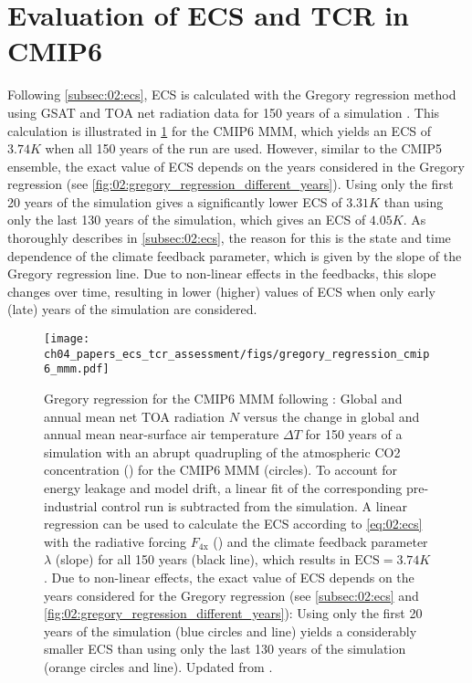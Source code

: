 \section{Evaluation of \acs{ECS} and \acs{TCR} in \acs{CMIP}6}
\label{sec:04:evaluation_ecs_and_tcr}

Following \cref{subsec:02:ecs}, \ac{ECS} is calculated with the Gregory
regression method using \ac{GSAT} and \ac{TOA} net radiation data for 150 years
of a  simulation \autocite{Gregory2004}. This calculation is
illustrated in \cref{fig:04:gregory_regression_cmip6_mmm} for the \acs{CMIP}6
\ac{MMM}, which yields an \ac{ECS} of $3.74 \unit{K}$ when all 150 years of the
run are used. However, similar to the \acs{CMIP}5 ensemble, the exact value of
\ac{ECS} depends on the years considered in the Gregory regression (see
\cref{fig:02:gregory_regression_different_years}). Using only the first 20
years of the simulation gives a significantly lower \ac{ECS} of $3.31 \unit{K}$
than using only the last 130 years of the simulation, which gives an \ac{ECS}
of $4.05 \unit{K}$. As thoroughly describes in \cref{subsec:02:ecs}, the reason
for this is the state and time dependence of the climate feedback parameter,
which is given by the slope of the Gregory regression line. Due to non-linear
effects in the feedbacks, this slope changes over time, resulting in lower
(higher) values of \ac{ECS} when only early (late) years of the simulation are
considered.

\begin{figure}[t]
  \centering
  \texttt{[image: 
    ch04\_papers\_ecs\_tcr\_assessment/figs/gregory\_regression\_cmip6\_mmm.pdf]}
  \caption{Gregory regression for the \acs{CMIP}6 \acf{MMM} following
    \textcite{Gregory2004}: Global and annual mean net \acl{TOA} radiation $N$
    versus the change in global and annual mean near-surface air temperature
    $\Delta T$ for 150 years of a simulation with an abrupt quadrupling of the
    atmospheric \acs{CO2} concentration () for the \acs{CMIP}6
    \acs{MMM} (circles). To account for energy leakage and model drift, a
    linear fit of the corresponding pre-industrial control run is subtracted
    from the  simulation. A linear regression can be used to
    calculate the \acf{ECS} according to \cref{eq:02:ecs} with the radiative
    forcing $F_\text{4x}$ (\yintercept) and the climate feedback parameter
    $\lambda$ (slope) for all 150 years (black line), which results in
    $\text{ECS} = 3.74 \unit{K}$. Due to non-linear effects, the exact value
    of \acs{ECS} depends on the years considered for the Gregory regression
    (see \cref{subsec:02:ecs} and
    \cref{fig:02:gregory_regression_different_years}): Using only the first 20
    years of the simulation (blue circles and line) yields a considerably
    smaller \acs{ECS} than using only the last 130 years of the simulation
    (orange circles and line). Updated from \textcite{Meehl2020}.}
  \label{fig:04:gregory_regression_cmip6_mmm}
\end{figure}

